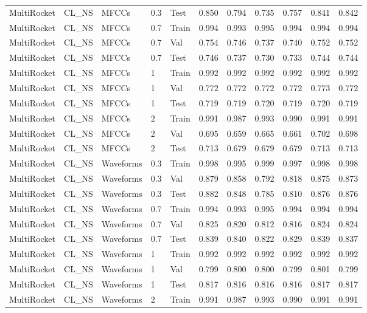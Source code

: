 \begin{landscape}
\begin{longtable}{|l|l|l|l|l|c|c|c|c|c|c|}
MultiRocket & CL\_NS & MFCCs & 0.3 & Test & 0.850 & 0.794 & 0.735 & 0.757 & 0.841 & 0.842 \\
MultiRocket & CL\_NS & MFCCs & 0.7 & Train & 0.994 & 0.993 & 0.995 & 0.994 & 0.994 & 0.994 \\
MultiRocket & CL\_NS & MFCCs & 0.7 & Val & 0.754 & 0.746 & 0.737 & 0.740 & 0.752 & 0.752 \\
MultiRocket & CL\_NS & MFCCs & 0.7 & Test & 0.746 & 0.737 & 0.730 & 0.733 & 0.744 & 0.744 \\
MultiRocket & CL\_NS & MFCCs & 1 & Train & 0.992 & 0.992 & 0.992 & 0.992 & 0.992 & 0.992 \\
MultiRocket & CL\_NS & MFCCs & 1 & Val & 0.772 & 0.772 & 0.772 & 0.772 & 0.773 & 0.772 \\
MultiRocket & CL\_NS & MFCCs & 1 & Test & 0.719 & 0.719 & 0.720 & 0.719 & 0.720 & 0.719 \\
MultiRocket & CL\_NS & MFCCs & 2 & Train & 0.991 & 0.987 & 0.993 & 0.990 & 0.991 & 0.991 \\
MultiRocket & CL\_NS & MFCCs & 2 & Val & 0.695 & 0.659 & 0.665 & 0.661 & 0.702 & 0.698 \\
MultiRocket & CL\_NS & MFCCs & 2 & Test & 0.713 & 0.679 & 0.679 & 0.679 & 0.713 & 0.713 \\
MultiRocket & CL\_NS & Waveforms & 0.3 & Train & 0.998 & 0.995 & 0.999 & 0.997 & 0.998 & 0.998 \\
MultiRocket & CL\_NS & Waveforms & 0.3 & Val & 0.879 & 0.858 & 0.792 & 0.818 & 0.875 & 0.873 \\
MultiRocket & CL\_NS & Waveforms & 0.3 & Test & 0.882 & 0.848 & 0.785 & 0.810 & 0.876 & 0.876 \\
MultiRocket & CL\_NS & Waveforms & 0.7 & Train & 0.994 & 0.993 & 0.995 & 0.994 & 0.994 & 0.994 \\
MultiRocket & CL\_NS & Waveforms & 0.7 & Val & 0.825 & 0.820 & 0.812 & 0.816 & 0.824 & 0.824 \\
MultiRocket & CL\_NS & Waveforms & 0.7 & Test & 0.839 & 0.840 & 0.822 & 0.829 & 0.839 & 0.837 \\
MultiRocket & CL\_NS & Waveforms & 1 & Train & 0.992 & 0.992 & 0.992 & 0.992 & 0.992 & 0.992 \\
MultiRocket & CL\_NS & Waveforms & 1 & Val & 0.799 & 0.800 & 0.800 & 0.799 & 0.801 & 0.799 \\
MultiRocket & CL\_NS & Waveforms & 1 & Test & 0.817 & 0.816 & 0.816 & 0.816 & 0.817 & 0.817 \\
MultiRocket & CL\_NS & Waveforms & 2 & Train & 0.991 & 0.987 & 0.993 & 0.990 & 0.991 & 0.991 \\

\end{longtable}
\end{landscape}
